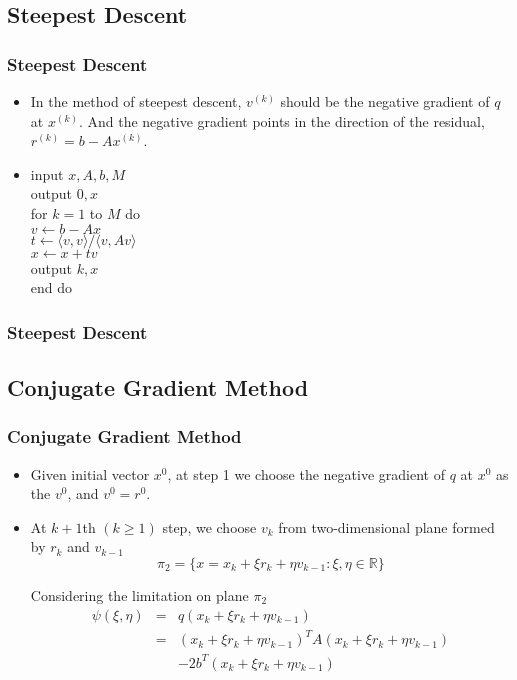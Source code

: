 \documentclass[notheorems,mathserif,table,compress]{beamer}  %
\begin{document}
\subsection{Steepest Descent}
%
\begin{frame}
\frametitle{Steepest Descent}
\begin{itemize}
\item In the method of steepest descent, $v^{(k)}$ should be the negative gradient of $q$ at $x^{(k)}$. And the negative gradient points in the direction of the residual, $r^{(k)}=b-Ax^{(k)}$.
\item 
input $x,A,b,M$\\
output $0,x$\\
for $k=1$ to $M$ do\\
\qquad$v\leftarrow b-Ax$\\
\qquad$t\leftarrow \langle v,v \rangle/\langle v,Av \rangle$\\
\qquad$x\leftarrow x+tv$\\
\qquad output $k,x$\\
end do

\end{itemize}
\end{frame}

%
\begin{frame} 
\frametitle{Steepest Descent}

\end{frame}

\subsection{Conjugate Gradient Method}

%
\begin{frame}
\frametitle{Conjugate Gradient Method} 
\begin{itemize}
\item Given initial vector $x^0$, at step 1 we choose the negative gradient of $q$ at $x^0$ as the $v^0$, and $v^0=r^0$.
\item At ${k+1}$th $(k\geq 1)$ step, we choose $v_k$ from two-dimensional plane formed by $r_k$ and $v_{k-1}$
\begin{displaymath}
\pi_2=\{x=x_k+\xi r_k+\eta v_{k-1}:\xi,\eta \in \mathbb{R}\}
\end{displaymath} 

Considering the limitation on plane $\pi_2$ 
\begin{eqnarray*}
\psi(\xi,\eta)&=&q(x_k+\xi r_k+\eta v_{k-1})\\
&=&(x_k+\xi r_k+\eta v_{k-1})^TA(x_k+\xi r_k+\eta v_{k-1})\\
& &-2b^T(x_k+\xi r_k+\eta v_{k-1})
\end{eqnarray*}

\end{itemize}
\end{frame}
\end{document}
